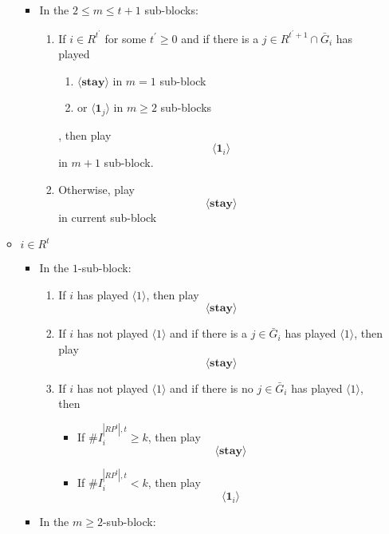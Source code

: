 \documentclass[12pt,letter]{article}
\theoremstyle{definition}
\theoremstyle{remark}
\theoremstyle{claim}
\begin{document}
\begin{itemize}
\begin{itemize}
\begin{itemize}
\item In the $2\leq m\leq t+1$ sub-blocks: 

\begin{enumerate}

\item If $i\in R^{t^{'}}$ for some $t^{'}\geq 0$ and if there is a $j\in R^{t^{'}+1}\cap \bar{G}_i$ has played 
\begin{enumerate}
\item $\langle \textbf{stay} \rangle $ in $m=1$ sub-block
\item or $\langle \mathbf{1}_j \rangle$ in $m\geq 2$ sub-blocks
\end{enumerate}
, then play 
\[\langle \mathbf{1}_i \rangle\] in $m+1$ sub-block.

\item Otherwise, play
\[\langle \textbf{stay} \rangle\] in current sub-block
\end{enumerate}

\end{itemize}

\item $i\in R^t$

\begin{itemize}
\item In the $1$-sub-block:
\begin{enumerate}
\item If $i$ has played $\langle 1 \rangle$, then play
\[\langle \textbf{stay} \rangle \]

\item If $i$ has not played $\langle 1 \rangle$ and if there is a $j\in \bar{G}_i$ has played $\langle 1 \rangle$, then play
\[\langle \textbf{stay} \rangle \]

\item If $i$ has not played $\langle 1 \rangle$ and if there is no $j\in \bar{G}_i$ has played $\langle 1 \rangle$, then
\begin{itemize}
\item If $\# I^{|RP^t|,t}_i\geq k$, then play
\[\langle \textbf{stay} \rangle \]
\item If $\# I^{|RP^t|,t}_i< k$, then play
\[\langle \mathbf{1}_i  \rangle \]
\end{itemize}

\end{enumerate}

\item In the $m\geq 2$-sub-block: 

\begin{enumerate}


\end{enumerate}
\end{itemize}
\end{itemize}
\end{itemize}
\end{document}
